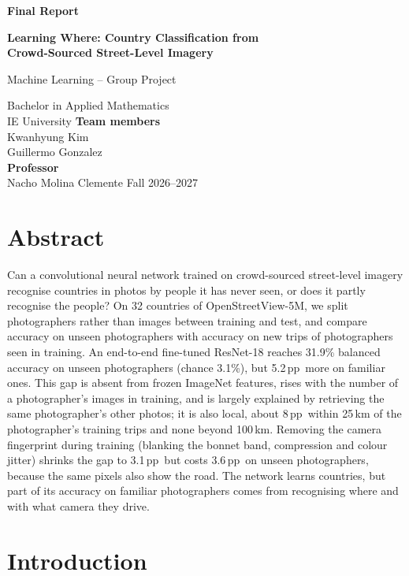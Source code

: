 \documentclass[11pt]{article}
\newcommand{\pp}{\,pp}
\begin{document}
\begin{titlepage}
\centering
\vspace*{5cm}
{\large\bfseries Final Report\par}\vspace{1cm}
{\LARGE\bfseries Learning Where: Country Classification from\\[4pt] Crowd-Sourced Street-Level Imagery\par}
\vspace{1cm}
{\large Machine Learning -- Group Project\par}\vspace{4pt}
Bachelor in Applied Mathematics\\ IE University
\vfill
{\bfseries Team members}\\[4pt] Kwanhyung Kim\\ Guillermo Gonzalez\\[1cm]
{\bfseries Professor}\\[4pt] Nacho Molina Clemente
\vfill
Fall 2026--2027
\end{titlepage}

\section*{Abstract}
Can a convolutional neural network trained on crowd-sourced street-level imagery recognise countries in
photos by people it has never seen, or does it partly recognise the people? On 32 countries of
OpenStreetView-5M, we split photographers rather than images between training and test, and compare
accuracy on unseen photographers with accuracy on new trips of photographers seen in training. An
end-to-end fine-tuned ResNet-18 reaches 31.9\% balanced accuracy on unseen photographers (chance 3.1\%),
but 5.2\pp\ more on familiar ones. This gap is absent from frozen ImageNet features, rises with the number
of a photographer's images in training, and is largely explained by retrieving the same photographer's
other photos; it is also local, about 8\pp\ within 25\,km of the photographer's training trips and
none beyond 100\,km. Removing the camera
fingerprint during training (blanking the bonnet band, compression and colour jitter) shrinks the gap to
3.1\pp\ but costs 3.6\pp\ on unseen photographers, because the same pixels also show the road. The
network learns countries, but part of its accuracy on familiar photographers comes from recognising where
and with what camera they drive.

\section{Introduction}
\end{document}

